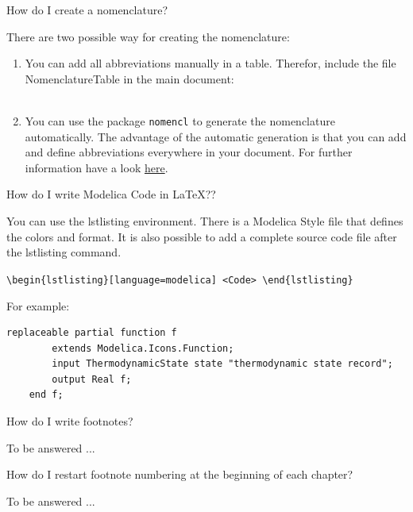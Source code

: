 \begin{QandA}

\item How do I create a nomenclature?

	\begin{answered}
		There are two possible way for creating the nomenclature:
		\begin{enumerate}
		\item You can add all abbreviations manually in a table. Therefor, include the file NomenclatureTable in the main document: \\
			\verb| |
		\item You can use the package \verb|nomencl| to generate the nomenclature automatically. The advantage of the automatic generation is that you can add and define abbreviations everywhere in your document. For further information have a look \href{http://texdoc.net/texmf-dist/doc/latex/nomencl/nomencl.pdf}{here}. %
			
		\end{enumerate}	
	\end{answered}
	
	
	
\item How do I write Modelica Code in \LaTeX??

	\begin{answered}
		You can use the lstlisting environment. There is a Modelica Style file that defines the colors and format. It is also possible to add a complete source code file after the lstlisting command.
		
		\verb|\begin{lstlisting}[language=modelica] <Code> \end{lstlisting}|
		
		For example:
\begin{lstlisting}[language=modelica]
	replaceable partial function f
		extends Modelica.Icons.Function;
		input ThermodynamicState state "thermodynamic state record";
		output Real f;
	end f;
\end{lstlisting}
	\end{answered}
	
	
\item How do I write footnotes?

	\begin{answered}
		To be answered ... 
	\end{answered}
	
	
\item How do I restart footnote numbering at the beginning of each chapter?

	\begin{answered}
		To be answered ... 
	\end{answered}

\end{QandA}